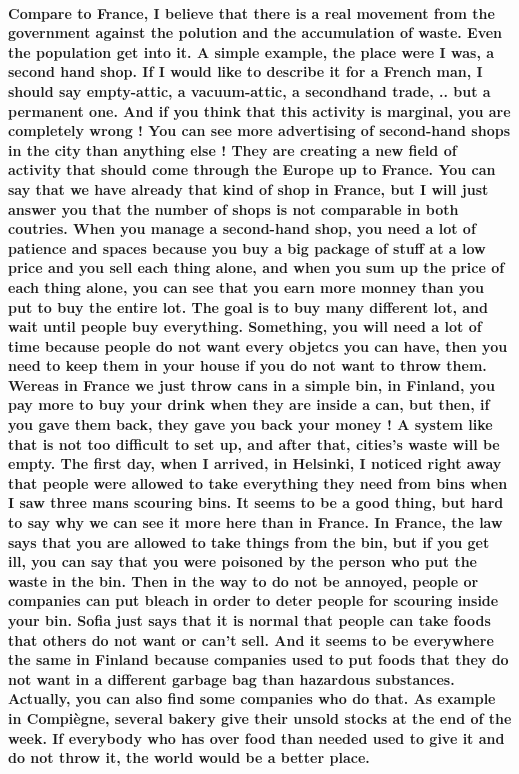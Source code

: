 \documentclass[a4paper,12pt]{report} %
\begin{document}
\paragraph{Compare to France, I believe that there is a real movement from the government against the polution and the accumulation of waste. Even the population get into it. A simple example, the place were I was, a second hand shop. If I would like to describe it for a French man, I should say empty-attic, a vacuum-attic, a secondhand trade, .. but a permanent one. And if you think that this activity is marginal, you are completely wrong ! You can see more advertising of second-hand shops in the city than anything else ! They are creating a new field of activity that should come through the Europe up to France. You can say that we have already that kind of shop in France, but I will just answer you that the number of shops is not comparable in both coutries. When you manage a second-hand shop, you need a lot of patience and spaces because you buy a big package of stuff at a low price and you sell each thing alone, and when you sum up the price of each thing alone, you can see that you earn more monney than you put to buy the entire lot. The goal is to buy many different lot, and wait until people buy everything. Something, you will need a lot of time because people do not want every objetcs you can have, then you need to keep them in your house if you do not want to throw them. \newline
Wereas in France we just throw cans in a simple bin, in Finland, you pay more to buy your drink when they are inside a can, but then, if you gave them back, they gave you back your money ! A system like that is not too difficult to set up, and after that, cities's waste will be empty. \newline
The first day, when I arrived, in Helsinki, I noticed right away that people were allowed to take everything they need from bins when I saw three mans scouring bins. It seems to be a good thing, but hard to say why we can see it more here than in France. In France, the law says that you are allowed to take things from the bin, but if you get ill, you can say that you were poisoned by the person who put the waste in the bin. Then in the way to do not be annoyed, people or companies can put bleach in order to deter people for scouring inside your bin. Sofia just says that it is normal that people can take foods that others do not want or can't sell. And it seems to be everywhere the same in Finland because companies used to put foods that they do not want in a different garbage bag than hazardous substances. Actually, you can also find some companies who do that. As example in Compiègne, several bakery give their unsold stocks at the end of the week. If everybody who has over food than needed used to give it and do not throw it, the world would be a better place. \newline
}
\end{document}
